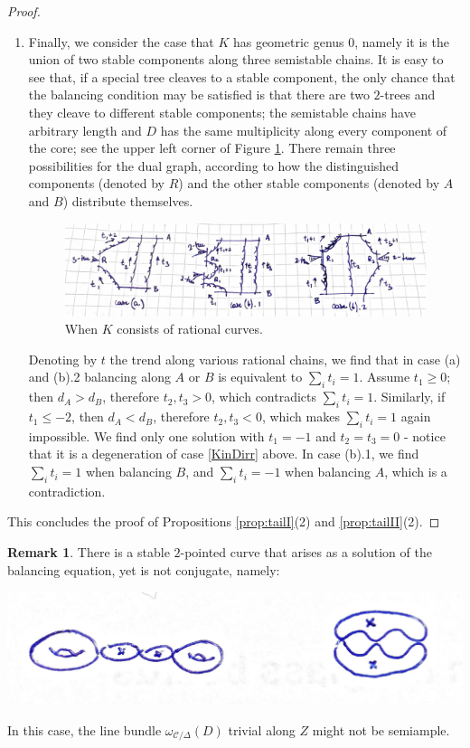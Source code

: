 \documentclass[11pt]{amsart}
\newcommand{\dvr}{\Delta}
\theoremstyle{plain}
\theoremstyle{definition}
\newtheorem{rem}[thm]{Remark}
\begin{document}
\begin{proof}
\begin{enumerate}[leftmargin=.6cm]
 \item Finally, we consider the case that $K$ has geometric genus $0$, namely it is the union of two stable components along three semistable chains. It is easy to see that, if a special tree cleaves to a stable component, the only chance that the balancing condition may be satisfied is that there are two $2$-trees and they cleave to different stable components; the semistable chains have arbitrary length and $D$ has the same multiplicity along every component of the core; see the upper left corner of Figure \ref{fig:Krat}. There remain three possibilities for the dual graph, according to how the distinguished components (denoted by $R$) and the other stable components (denoted by $A$ and $B$) distribute themselves.
  \begin{figure}
 \includegraphics[width=.8\textwidth]{rational_pretzel} 
 \caption{When $K$ consists of rational curves.}\label{fig:Krat}
  \end{figure}
 Denoting by $t$ the trend along various rational chains, we find that in case (a) and (b).2 balancing along $A$ or $B$ is equivalent to $\sum_it_i=1$. Assume $t_1\geq0$; then $d_A>d_B$, therefore $t_2,t_3>0$, which contradicts $\sum_it_i=1$. Similarly, if $t_1\leq -2$, then $d_A<d_B$, therefore $t_2,t_3<0$, which makes $\sum_it_i=1$ again impossible. We find only one solution with $t_1=-1$ and $t_2=t_3=0$ - notice that it is a degeneration of case \ref{KinDirr} above.
 In case (b).1, we find $\sum_it_i=1$ when balancing $B$, and $\sum_it_i=-1$ when balancing $A$, which is a contradiction.
\end{enumerate}
This concludes the proof of Propositions \ref{prop:tailI}(2) and \ref{prop:tailII}(2).
\end{proof}
\begin{rem}\label{rmk:extra_conjugate}
There is a stable $2$-pointed curve that arises as a solution of the balancing equation, yet is not conjugate, namely:
  \begin{center}
 \includegraphics[width=.6\textwidth]{extra_conjugate}  
  \end{center}
In this case, the line bundle $\omega_{\mathcal C/\dvr}(D)$ trivial along $Z$ might not be semiample.
\end{rem}
\end{document}
